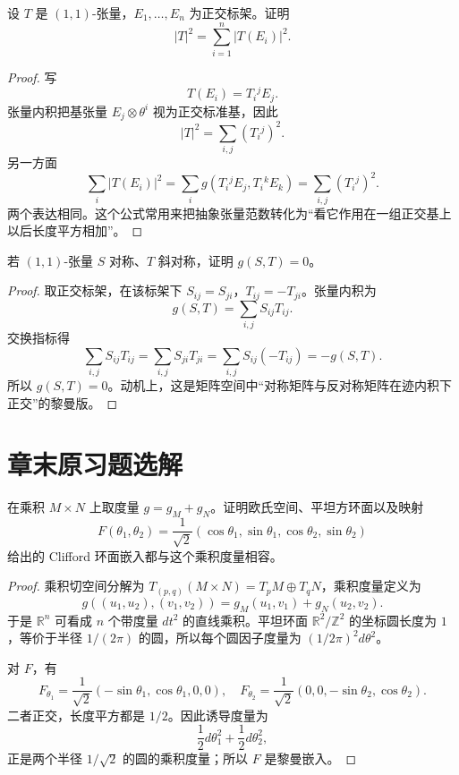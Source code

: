\documentclass[11pt,a4paper,openany]{ctexbook}
\numberwithin{equation}{chapter}
\begin{document}
\begin{problem}
设 \(T\) 是 \((1,1)\)-张量，\(E_1,\ldots,E_n\) 为正交标架。证明
\[
|T|^2=\sum_{i=1}^n |T(E_i)|^2.
\]
\end{problem}
\begin{proof}
写
\[
T(E_i)=T_i{}^jE_j.
\]
张量内积把基张量 \(E_j\otimes\theta^i\) 视为正交标准基，因此
\[
|T|^2=\sum_{i,j}(T_i{}^j)^2.
\]
另一方面
\[
\sum_i |T(E_i)|^2=\sum_i g(T_i{}^jE_j,T_i{}^kE_k)
=\sum_{i,j}(T_i{}^j)^2.
\]
两个表达相同。这个公式常用来把抽象张量范数转化为“看它作用在一组正交基上以后长度平方相加”。
\end{proof}

\begin{problem}
若 \((1,1)\)-张量 \(S\) 对称、\(T\) 斜对称，证明 \(g(S,T)=0\)。
\end{problem}
\begin{proof}
取正交标架，在该标架下 \(S_{ij}=S_{ji}\)，\(T_{ij}=-T_{ji}\)。张量内积为
\[
g(S,T)=\sum_{i,j}S_{ij}T_{ij}.
\]
交换指标得
\[
\sum_{i,j}S_{ij}T_{ij}
=\sum_{i,j}S_{ji}T_{ji}
=\sum_{i,j}S_{ij}(-T_{ij})
=-g(S,T).
\]
所以 \(g(S,T)=0\)。动机上，这是矩阵空间中“对称矩阵与反对称矩阵在迹内积下正交”的黎曼版。
\end{proof}

\section{章末原习题选解}

\begin{problem}
在乘积 \(M\times N\) 上取度量 \(g=g_M+g_N\)。证明欧氏空间、平坦方环面以及映射
\[
F(\theta_1,\theta_2)=\frac1{\sqrt2}(\cos\theta_1,\sin\theta_1,\cos\theta_2,\sin\theta_2)
\]
给出的 Clifford 环面嵌入都与这个乘积度量相容。
\end{problem}
\begin{proof}
乘积切空间分解为 \(T_{(p,q)}(M\times N)=T_pM\oplus T_qN\)，乘积度量定义为
\[
g((u_1,u_2),(v_1,v_2))=g_M(u_1,v_1)+g_N(u_2,v_2).
\]
于是 \(\mathbb R^n\) 可看成 \(n\) 个带度量 \(dt^2\) 的直线乘积。平坦环面 \(\mathbb R^2/\mathbb Z^2\) 的坐标圆长度为 \(1\)，等价于半径 \(1/(2\pi)\) 的圆，所以每个圆因子度量为 \((1/2\pi)^2d\theta^2\)。

对 \(F\)，有
\[
F_{\theta_1}=\frac1{\sqrt2}(-\sin\theta_1,\cos\theta_1,0,0),\quad
F_{\theta_2}=\frac1{\sqrt2}(0,0,-\sin\theta_2,\cos\theta_2).
\]
二者正交，长度平方都是 \(1/2\)。因此诱导度量为
\[
\frac12d\theta_1^2+\frac12d\theta_2^2,
\]
正是两个半径 \(1/\sqrt2\) 的圆的乘积度量；所以 \(F\) 是黎曼嵌入。
\end{proof}
\end{document}
